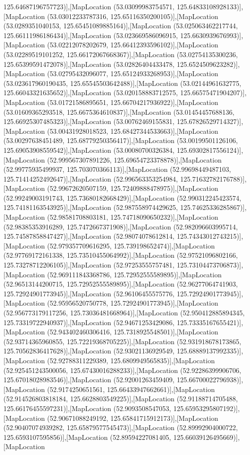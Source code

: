 125.64687196757723)],[MapLocation (53.03099983754571, 125.64833108928133)],[MapLocation (53.03012233787316, 125.65116350200105)],[MapLocation (53.0289351040153, 125.65451089885164)],[MapLocation (53.025063462217744, 125.66111986186434)],[MapLocation (53.023669586096915, 125.6630939676993)],[MapLocation (53.02212078202679, 125.66412393596102)],[MapLocation (53.02289519101252, 125.66172067668367)],[MapLocation (53.02754135300236, 125.65399591472078)],[MapLocation (53.02826404433478, 125.6524509623282)],[MapLocation (53.02795432096077, 125.65124933268953)],[MapLocation (53.023617960190435, 125.65545503642488)],[MapLocation (53.02144961632775, 125.66043321635652)],[MapLocation (53.020158883712575, 125.66575471904207)],[MapLocation (53.01721586895651, 125.66704217936922)],[MapLocation (53.01609365293518, 125.6675364610837)],[MapLocation (53.01454457688136, 125.66925307485323)],[MapLocation (53.00762469155831, 125.67826529714327)],[MapLocation (53.00431928018523, 125.68427344533663)],[MapLocation (53.00297638451489, 125.68779250356417)],[MapLocation (53.00199501126106, 125.69053908559542)],[MapLocation (53.00080700326384, 125.69302817556124)],[MapLocation (52.999567307891226, 125.69654723378878)],[MapLocation (52.99775935499937, 125.703070366113)],[MapLocation (52.99698449487103, 125.71414252492647)],[MapLocation (52.996563353254984, 125.71632782176788)],[MapLocation (52.99672620507159, 125.72409888478975)],[MapLocation (52.99249003191743, 125.73680182668429)],[MapLocation (52.990312245423574, 125.74181163543925)],[MapLocation (52.987558974429625, 125.74625336285867)],[MapLocation (52.98581708803181, 125.74718090650232)],[MapLocation (52.98385353916289, 125.7472667371908)],[MapLocation (52.982096603995714, 125.74587858847427)],[MapLocation (52.98074078612814, 125.74343012743215)],[MapLocation (52.979357709616295, 125.739198652474)],[MapLocation (52.97769172161338, 125.73510455064992)],[MapLocation (52.97521096802166, 125.73278712206105)],[MapLocation (52.97253555757481, 125.73104473706873)],[MapLocation (52.969111843368786, 125.72952555589895)],[MapLocation (52.96513144200715, 125.72952555589895)],[MapLocation (52.96277064741903, 125.72924901773945)],[MapLocation (52.96106455575776, 125.72924901773945)],[MapLocation (52.95956520750778, 125.72924901773945)],[MapLocation (52.956773179117256, 125.73036481668964)],[MapLocation (52.950412885894345, 125.73319722940937)],[MapLocation (52.94671253429086, 125.73335167655421)],[MapLocation (52.943402460306416, 125.7318925548501)],[MapLocation (52.93714365960855, 125.72219368705225)],[MapLocation (52.931918678173865, 125.70562836417628)],[MapLocation (52.93021136929549, 125.68889137992335)],[MapLocation (52.92788311229389, 125.6809949565835)],[MapLocation (52.925451243500056, 125.67430016288233)],[MapLocation (52.92286399906706, 125.67018028983546)],[MapLocation (52.92001263459409, 125.66700022796938)],[MapLocation (52.9174250651561, 125.66433947662661)],[MapLocation (52.914526803818184, 125.6628803549225)],[MapLocation (52.91188714705488, 125.66176455597231)],[MapLocation (52.9093508547053, 125.65953295807192)],[MapLocation (52.90671088249192, 125.65841715912173)],[MapLocation (52.90407074939282, 125.65879577545473)],[MapLocation (52.89992904000722, 125.6593107595856)],[MapLocation (52.89594227081405, 125.66039126495669)],[MapLocation 